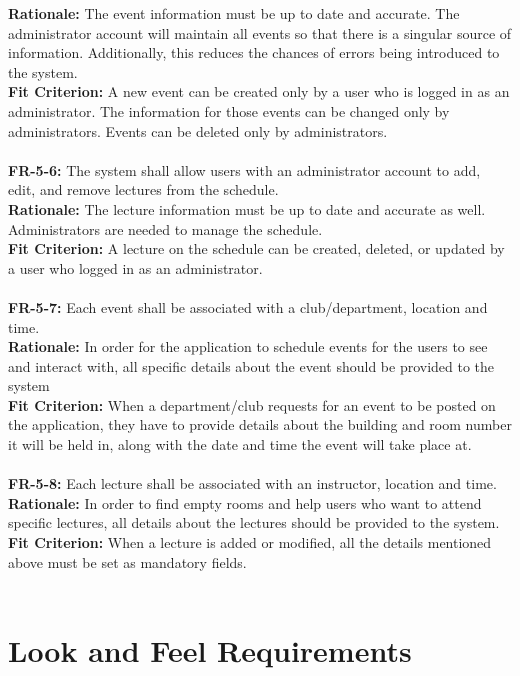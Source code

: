 \documentclass[12pt]{article}
\begin{document}
    \textbf{Rationale:} The event information must be up to date and accurate. The administrator account will maintain all events so that there is a singular source of information. Additionally, this reduces the chances of errors being introduced to the system.\\
    \textbf{Fit Criterion:} A new event can be created only by a user who is logged in as an administrator. The information for those events can be changed only by administrators. Events can be deleted only by administrators.\\\\
    \textbf{FR-5-6:} The system shall allow users with an administrator account to add, edit, and remove lectures from the schedule.\\
    \textbf{Rationale:} The lecture information must be up to date and accurate as well. Administrators are needed to manage the schedule.\\
    \textbf{Fit Criterion:} A lecture on the schedule can be created, deleted, or updated by a user who logged in as an administrator.\\\\
    \textbf{FR-5-7:} Each event shall be associated with a club/department, location and time.\\
    \textbf{Rationale:} In order for the application to schedule events for the users to see and interact with, all specific details about the event should be provided to the system\\
    \textbf{Fit Criterion:} When a department/club requests for an event to be posted on the application, they have to provide details about the building and room number it will be held in, along with the date and time the event will take place at.\\\\
    \textbf{FR-5-8:} Each lecture shall be associated with an instructor, location and time.\\
    \textbf{Rationale:} In order to find empty rooms and help users who want to attend specific lectures, all details about the lectures should be provided to the system.\\
    \textbf{Fit Criterion:} When a lecture is added or modified, all the details mentioned above must be set as mandatory fields.\\\\

\section{Look and Feel Requirements}
\end{document}
